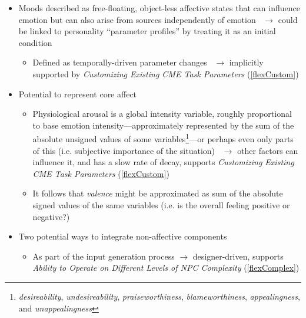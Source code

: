 \begin{itemize}
\begin{itemize}
        \item Moods described as free-floating, object-less affective states
        that can influence emotion but can also arise from sources
        independently of emotion~\citep[p.~27]{clore2000cognition}
        $\rightarrow$ could be linked to personality ``parameter profiles'' by
        treating it as an initial condition
        \begin{itemize}
            \item Defined as temporally-driven parameter changes~\citep[p.~184,
            189--190]{occ} $\rightarrow$ implicitly supported by
            \textit{Customizing Existing CME Task Parameters} (\ref{flexCustom})
        \end{itemize}

        \item Potential to represent core affect
        \begin{itemize}
            \item Physiological arousal is a global intensity variable,
            roughly proportional to base emotion
            intensity---approximately represented by the sum of the absolute
            unsigned values of some variables\footnote{\textit{desireability},
                \textit{undesireability}, \textit{praiseworthiness},
                \textit{blameworthiness}, \textit{appealingness}, and
                \textit{unappealingness}}---or perhaps even only parts of this
            (i.e. subjective importance of the situation)~\citep[p.~51,
            65--66]{occ} $\rightarrow$ other factors can influence it, and has
            a slow rate of decay, supports \textit{Customizing Existing CME
                Task Parameters} (\ref{flexCustom})

            \item It follows that \textit{valence} might be approximated as sum
            of the absolute signed values of the same variables (i.e. is the
            overall feeling positive or negative?)
        \end{itemize}

        \item Two potential ways to integrate non-affective components
        \begin{itemize}
            \item As part of the input generation process $\rightarrow$
            designer-driven, supports \textit{Ability to Operate on Different
                Levels of NPC Complexity} (\ref{flexComplex})


\end{itemize}
\end{itemize}
\end{itemize}
